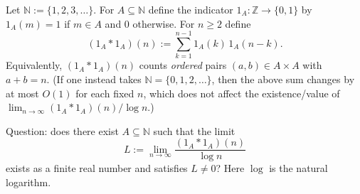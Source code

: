 Let $\mathbb N:=\{1,2,3,\dots\}$. For $A\subseteq\mathbb N$ define the indicator $1_A:\mathbb Z\to\{0,1\}$ by $1_A(m)=1$ if $m\in A$ and $0$ otherwise. For $n\ge 2$ define
\[
(1_A\ast 1_A)(n)
:=\sum_{k=1}^{n-1} 1_A(k)\,1_A(n-k).
\]
Equivalently, $(1_A\ast 1_A)(n)$ counts \emph{ordered} pairs $(a,b)\in A\times A$ with $a+b=n$.
(If one instead takes $\mathbb N=\{0,1,2,\dots\}$, then the above sum changes by at most $O(1)$ for each fixed $n$, which does not affect the existence/value of $\lim_{n\to\infty}(1_A\ast 1_A)(n)/\log n$.)

Question: does there exist $A\subseteq\mathbb N$ such that the limit
\[
L:=\lim_{n\to\infty} \frac{(1_A\ast 1_A)(n)}{\log n}
\]
exists as a finite real number and satisfies $L\neq 0$? Here $\log$ is the natural logarithm.
